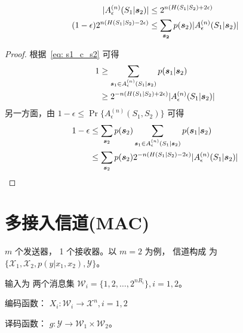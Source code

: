 \documentclass{article}
\DeclarePairedDelimiter\abs{\lvert}{\rvert}
\def\X{\mathcal{X}}
\def\Y{\mathcal{Y}}
\def\W{\mathcal{W}}
\begin{document}
\begin{enumerate}
\begin{align}
\label{eq: s1s2Upper} \abs{A_{\epsilon}^{(n)}(S_1 | \bm{s}_2 ) }& \leq 2^{n ( H(S_1 | S_2) + 2\epsilon)} \\
\label{eq: s1s2Lower}(1 - \epsilon)  2^{n ( H(S_1 | S_2) - 2\epsilon)} & \leq
 \sum_{\bm{s_2}} p(\bm{s}_2)\abs{  A_{\epsilon}^{(n)}(S_1 | \bm{s}_2 ) }
\end{align}
\begin{proof}
根据~\eqref{eq: s1_c_s2} 可得
\begin{align*}
1 & \geq \sum_{\bm{s}_1 \in A_{\epsilon}^{(n)}(S_1 | \bm{s}_2 ) } p(\bm{s}_1 | \bm{s}_2 ) \\
& \geq 2^{-n(H(S_1 | S_2) + 2\epsilon)} \abs{ A_{\epsilon}^{(n)}(S_1 | \bm{s}_2 )}
\end{align*}
另一方面，由 $ 1 - \epsilon \leq \Pr\{  A_{\epsilon}^{(n)}(S_1, S_2) \} $ 可得
\begin{align*}
1 - \epsilon & \leq \sum_{\bm{s}_2} p(\bm{s}_2) \sum_{\bm{s}_1 \in A_{\epsilon}^{(n)}(S_1 | \bm{s}_2 ) } p(\bm{s}_1 | \bm{s}_2 ) \\
& \leq  \sum_{\bm{s}_2} p(\bm{s}_2) 2^{-n(H(S_1 | S_2) - 2\epsilon)} \abs{A_{\epsilon}^{(n)}(S_1 | \bm{s}_2 )}
\end{align*}      
\end{proof}
\end{enumerate}
\section{多接入信道(MAC)}
$m $ 个发送器， 1 个接收器。以  $m = 2 $ 为例，
信道构成 为 $ \{ \mathcal{X}_1, \mathcal{X}_2, p(y | x_1, x_2), \mathcal{Y} \} $。

输入为 两个消息集 $ \mathcal{W}_i = \{ 1, 2, \dots, 2^{nR_i} \}, i = 1, 2 $。

编码函数： $ X_i: \mathcal{W}_i  \to \X^n, i = 1, 2 $

译码函数： $ g: \Y \to \W_1 \times \W_2 $。
\end{document}
